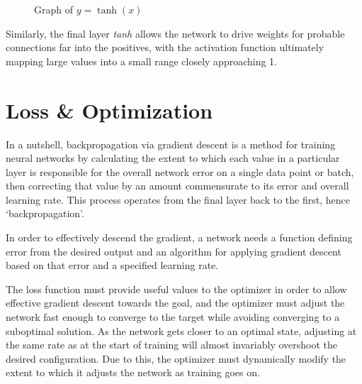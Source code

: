 \begin{wrapfigure}[5]{r}{.45\textwidth}
	\centering
	\vspace{-14pt}
	\caption{Graph of $y=\tanh(x)$}
	\label{fig:tanh}
\end{wrapfigure}
Similarly, the final layer \textit{tanh} allows the network to drive weights for 
probable connections far into the positives, with the activation function 
ultimately mapping large values into a small range closely approaching 1.

\section{Loss \& Optimization}
In a nutshell, backpropagation via gradient descent is a method for training 
neural networks by calculating the extent to which each value in a particular 
layer is responsible for the overall network error on a single data point or 
batch, then correcting that value by an amount commensurate to its error and 
overall learning rate. This process operates from the final layer back to the 
first, hence `backpropagation'.\cite{Rumelhart}

In order to effectively descend the gradient, a network needs a function 
defining error from the desired output and an algorithm for applying gradient 
descent based on that error and a specified learning rate.

The loss function must provide useful values to the optimizer in order to allow 
effective gradient descent towards the goal, and the optimizer must adjust the 
network fast enough to converge to the target while avoiding converging to a 
suboptimal solution. As the network gets closer to an optimal state, adjusting 
at the same rate as at the start of training will almost invariably overshoot 
the desired configuration. Due to this, the optimizer must dynamically modify 
the extent to which it adjusts the network as training goes on.

